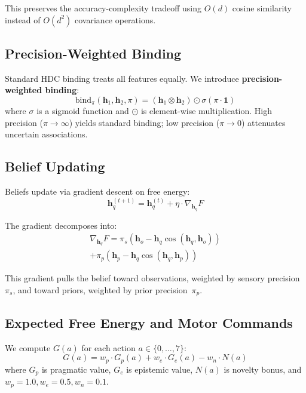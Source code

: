 \documentclass[10pt,letterpaper]{article}
\newcommand{\hvec}[1]{\mathbf{h}_{#1}}
\begin{document}
This preserves the accuracy-complexity tradeoff using $O(d)$ cosine similarity instead of $O(d^2)$ covariance operations.

\subsection{Precision-Weighted Binding}

Standard HDC binding treats all features equally. We introduce \textbf{precision-weighted binding}:
\begin{equation}
\mathrm{bind}_\pi(\hvec{1}, \hvec{2}, \pi) = (\hvec{1} \otimes \hvec{2}) \odot \sigma(\pi \cdot \mathbf{1})
\end{equation}
where $\sigma$ is a sigmoid function and $\odot$ is element-wise multiplication.
High precision ($\pi \to \infty$) yields standard binding; low precision ($\pi \to 0$) attenuates uncertain associations.

\subsection{Belief Updating}

Beliefs update via gradient descent on free energy:
\begin{equation}
\hvec{q}^{(t+1)} = \hvec{q}^{(t)} + \eta \cdot \nabla_{\hvec{q}} F
\end{equation}

The gradient decomposes into:
\begin{multline}
\nabla_{\hvec{q}} F = \pi_s(\hvec{o} - \hvec{q}\cos(\hvec{q}, \hvec{o})) \\
  + \pi_p(\hvec{p} - \hvec{q}\cos(\hvec{q}, \hvec{p}))
\label{eq:gradient}
\end{multline}

This gradient pulls the belief toward observations, weighted by sensory precision~$\pi_s$, and toward priors, weighted by prior precision~$\pi_p$.

\subsection{Expected Free Energy and Motor Commands}

We compute $G(a)$ for each action $a \in \{0, \ldots, 7\}$:
\begin{equation}
G(a) = w_p \cdot G_p(a) + w_e \cdot G_e(a) - w_n \cdot N(a)
\end{equation}
where $G_p$ is pragmatic value, $G_e$ is epistemic value, $N(a)$ is novelty bonus, and $w_p=1.0, w_e=0.5, w_n=0.1$.
\end{document}
